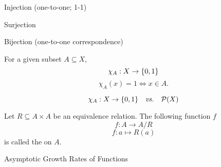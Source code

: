 
\begin{frame}{}
\end{frame}

\begin{frame}{}
  \begin{center}
    Injection (one-to-one; 1-1)

    \vspace{0.60cm}
    Surjection

    \vspace{0.60cm}
    Bijection (one-to-one correspondence)
  \end{center}
\end{frame}

\begin{frame}{}
  \begin{definition}
    For a given subset $A \subseteq X$,
    \[
      \chi_{A}: X \to \{0, 1\}
    \]
    \[
      \chi_{A}(x) = 1 \iff x \in A.
    \]
  \end{definition}

  \pause
  \vspace{0.30cm}
  \[
    \chi_{A}: X \to \{0, 1\} \quad\text{\it vs.}\quad \mathcal{P}(X)
  \]
\end{frame}

\begin{frame}{}
  \begin{definition}
    Let $R \subseteq A \times A$ be an equivalence relation.
    The following function $f$
    \[
      f: A \to A/R
    \]
    \[
      f: a \mapsto R(a)
    \]
    is called the  on $A$.
  \end{definition}

\end{frame}

\begin{frame}{}
  \begin{center}
    Asymptotic Growth Rates of Functions
  \end{center}

  \begin{columns}
  \end{columns}

  \vspace{0.30cm}
  \begin{center}
  \end{center}
\end{frame}
